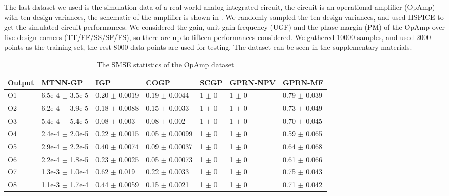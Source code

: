 The last dataset we used is the simulation data of a real-world analog integrated circuit, the circuit is an operational amplifier (OpAmp) with ten design variances, the schematic of the amplifier is shown in . We randomly sampled the ten design variances, and used HSPICE to get the simulated circuit performances. We considered the gain, unit gain frequency (UGF) and the phase margin (PM) of the OpAmp over five design corners (TT/FF/SS/SF/FS), so there are up to fifteen performances considered. We gathered 10000 samples, and used 2000 points as the training set, the rest 8000 data points are used for testing. The dataset can be seen in the supplementary materials.

\begin{table}[!htb]
    \centering
    \caption{The SMSE statistics of the OpAmp dataset}
    \label{tab:smse_DAC}
    \begin{tabular}{lllllll}
        \toprule
        Output & MTNN-GP               &  IGP                  & COGP                  & SCGP          &  GPRN-NPV    & GPRN-MF            \\ \midrule
        O1     &  6.5e-4 $\pm$  3.5e-5 &  0.20 $\pm$  0.0019   &  0.19 $\pm$  0.0044   &  1  $\pm$  0  &  1  $\pm$  0 &  0.79 $\pm$  0.039 \\
        O2     &  6.2e-4 $\pm$  3.9e-5 &  0.18 $\pm$  0.0088   &  0.15 $\pm$  0.0033   &  1  $\pm$  0  &  1  $\pm$  0 &  0.73 $\pm$  0.049 \\
        O3     &  5.4e-4 $\pm$  5.4e-5 &  0.08 $\pm$  0.003    &  0.08 $\pm$  0.002    &  1  $\pm$  0  &  1  $\pm$  0 &  0.70 $\pm$  0.045 \\
        O4     &  2.4e-4 $\pm$  2.0e-5 &  0.22 $\pm$  0.0015   &  0.05 $\pm$  0.00099  &  1  $\pm$  0  &  1  $\pm$  0 &  0.59 $\pm$  0.065 \\
        O5     &  2.9e-4 $\pm$  2.2e-5 &  0.40 $\pm$  0.0074   &  0.09 $\pm$  0.00037  &  1  $\pm$  0  &  1  $\pm$  0 &  0.64 $\pm$  0.068 \\
        O6     &  2.2e-4 $\pm$  1.8e-5 &  0.23 $\pm$  0.0025   &  0.05 $\pm$  0.00073  &  1  $\pm$  0  &  1  $\pm$  0 &  0.61 $\pm$  0.066 \\
        O7     &  1.3e-3 $\pm$  1.0e-4 &  0.62 $\pm$  0.019    &  0.22 $\pm$  0.0033   &  1  $\pm$  0  &  1  $\pm$  0 &  0.75 $\pm$  0.043 \\
        O8     &  1.1e-3 $\pm$  1.7e-4 &  0.44 $\pm$  0.0059   &  0.15 $\pm$  0.0021   &  1  $\pm$  0  &  1  $\pm$  0 &  0.71 $\pm$  0.042 \\

\end{tabular}
\end{table}

